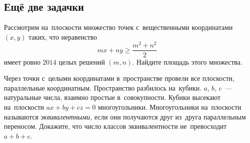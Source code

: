 


\subsection*{Ещё две задачки}


\begin{problems}

\item
Рассмотрим на~плоскости множество точек с~вещественными координатами $(x, y)$
таких, что неравенство
\[
    m x + n y
\geq
    \frac{m^2 + n^2}{2}
\]
имеет ровно $2014$ целых решений $(m, n)$.
Найдите площадь этого множества.

\item
Через точки с~целыми координатами в~пространстве провели все плоскости,
параллельные координатным.
Пространство разбилось на~кубики.
$a$, $b$, $c$~--- натуральные числа, взаимно простые в~совокупности.
Кубики высекают на~плоскости $ax + by + cz = 0$ многоугольники.
Многоугольники на~плоскости называются \emph{эквивалентными,} если они
получаются друг из~друга параллельным переносом.
Докажите, что число классов эквивалентности не~превосходит $a + b + c$.

\end{problems}

